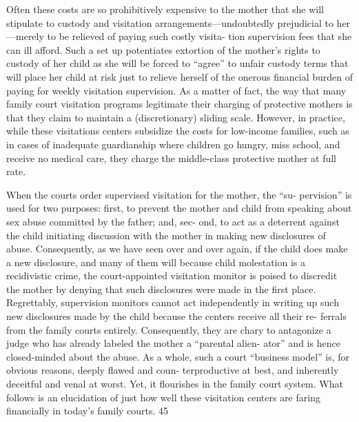 Often these costs are so prohibitively expensive to the mother that
she will stipulate to custody and visitation arrangements—undoubtedly
prejudicial to her—merely to be relieved of paying such costly visita-
tion supervision fees that she can ill afford. Such a set up potentiates
extortion of the mother’s rights to custody of her child as she will be
forced to “agree” to unfair custody terms that will place her child at
risk just to relieve herself of the onerous financial burden of paying for
weekly visitation supervision. As a matter of fact, the way that many
family court visitation programs legitimate their charging of protective
mothers is that they claim to maintain a (discretionary) sliding scale.
However, in practice, while these visitations centers subsidize the costs
for low-income families, such as in cases of inadequate guardianship
where children go hungry, miss school, and receive no medical care,
they charge the middle-class protective mother at full rate. \pfl{}


When the courts order supervised visitation for the mother, the “su-
pervision” is used for two purposes: first, to prevent the mother and
child from speaking about sex abuse committed by the father; and, sec-
ond, to act as a deterrent against the child initiating discussion with the
mother in making new disclosures of abuse. Consequently, as we have
seen over and over again, if the child does make a new disclosure, and
many of them will because child molestation is a recidivistic crime, the
court-appointed visitation monitor is poised to discredit the mother by
denying that such disclosures were made in the first place. Regrettably,
supervision monitors cannot act independently in writing up such new
disclosures made by the child because the centers receive all their re-
ferrals from the family courts entirely. Consequently, they are chary to
antagonize a judge who has already labeled the mother a “parental alien-
ator” and is hence closed-minded about the abuse. As a whole, such a
court “business model” is, for obvious reasons, deeply flawed and coun-
terproductive at best, and inherently deceitful and venal at worst. Yet,
it flourishes in the family court system. What follows is an elucidation
of just how well these visitation centers are faring financially in today’s
family courts. 45 \pfl{}



